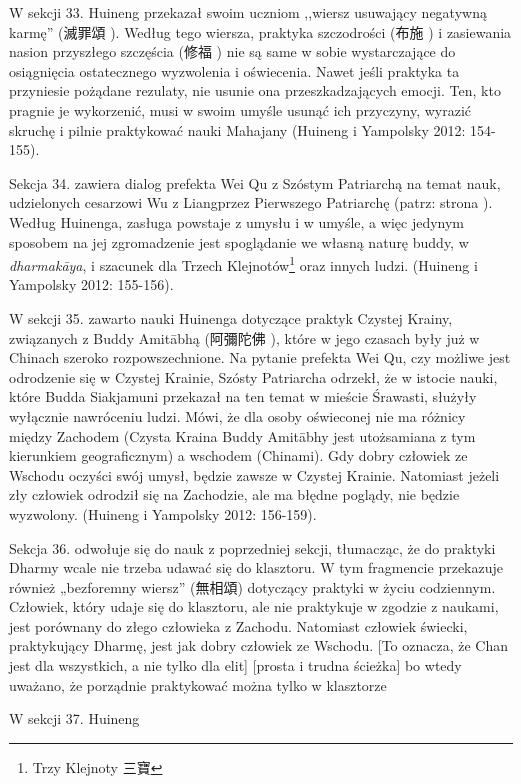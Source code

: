 W sekcji 33. Huineng przekazał swoim uczniom ,,wiersz usuwający negatywną karmę'' (滅罪頌 ).
Według tego wiersza, praktyka szczodrości (布施 ) i zasiewania nasion przyszłego szczęścia (修福 ) nie są same w sobie wystarczające do osiągnięcia ostatecznego wyzwolenia i oświecenia.
Nawet jeśli praktyka ta przyniesie pożądane rezulaty, nie usunie ona przeszkadzających emocji.
Ten, kto pragnie je wykorzenić, musi w swoim umyśle usunąć ich przyczyny, wyrazić skruchę i pilnie praktykować nauki Mahajany
(Huineng i Yampolsky 2012: 154-155).

Sekcja 34. zawiera dialog prefekta Wei Qu z Szóstym Patriarchą na temat nauk, udzielonych cesarzowi Wu z Liangprzez Pierwszego Patriarchę (patrz: strona \pageref{LiangWuDi}).
Według Huinenga, zasługa powstaje z umysłu i w umyśle, a więc jedynym sposobem na jej zgromadzenie jest spoglądanie we własną naturę buddy, w \textit{dharmakāya}, i szacunek dla Trzech Klejnotów\footnote{Trzy Klejnoty 三寶} oraz innych ludzi. %
(Huineng i Yampolsky 2012: 155-156).

W sekcji 35. zawarto nauki Huinenga dotyczące praktyk Czystej Krainy, związanych z Buddy Amitābhą (阿彌陀佛 ), które w jego czasach były już w Chinach szeroko rozpowszechnione.
Na pytanie prefekta Wei Qu, czy możliwe jest odrodzenie się w Czystej Krainie, Szósty Patriarcha odrzekł, że w istocie nauki, które Budda Siakjamuni przekazał na ten temat w mieście Śrawasti, służyły wyłącznie nawróceniu ludzi.
Mówi, że dla osoby oświeconej nie ma różnicy między Zachodem (Czysta Kraina Buddy Amitābhy jest utożsamiana z tym kierunkiem geograficznym) a wschodem (Chinami).
Gdy dobry człowiek ze Wschodu oczyści swój umysł, będzie zawsze w Czystej Krainie.
Natomiast jeżeli zły człowiek odrodził się na Zachodzie, ale ma błędne poglądy, nie będzie wyzwolony.
(Huineng i Yampolsky 2012: 156-159).

Sekcja 36. odwołuje się do nauk z poprzedniej sekcji, tłumacząc, że do praktyki Dharmy wcale nie trzeba udawać się do klasztoru.
W tym fragmencie przekazuje również „bezforemny wiersz” (無相頌) dotyczący praktyki w życiu codziennym.
Człowiek, który udaje się do klasztoru, ale nie praktykuje w zgodzie z naukami, jest porównany do złego człowieka z Zachodu.
Natomiast człowiek świecki, praktykujący Dharmę, jest jak dobry człowiek ze Wschodu.
[To oznacza, że Chan jest dla wszystkich, a nie tylko dla elit]
[prosta i trudna ścieżka] bo wtedy uważano, że porządnie praktykować można tylko w klasztorze
\fi

W sekcji 37. Huineng
